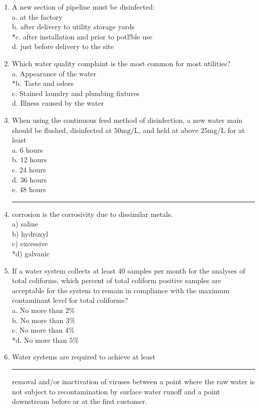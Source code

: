 \begin{enumerate}[1.]
\item A new section of pipeline must be disinfected:\\
a.  at the factory\\
b.  after delivery to utility storage yards\\
*c.  after installation and prior to potl!ble use\\
d. just before delivery to the site\\
\item Which water quality complaint is the most common for most utilities?\\
a. Appearance of the water\\
*b. Taste and odors\\
c. Stained laundry and plumbing fixtures\\
d. Illness caused by the water\\
\item When using the continuous feed method of disinfection, a new water main should be flushed, disinfected at $50 \mathrm{mg} / \mathrm{L}$, and held at above $25 \mathrm{mg} / \mathrm{L}$ for at least\\
a. 6 hours\\
b. 12 hours\\
c. 24 hours\\
d. 36  hours\\
e. 48 hours\\
\item \rule{2cm}{0.5pt}corrosion is the corrosivity due to dissimilar metals.\\
a) saline\\
b) hydroxyl\\
c) excessive\\
*d) galvanic\\
\item If a water system collects at least 40 samples per month for the analyses of total coliforms, which percent of total coliform positive samples are acceptable for the system to remain in compliance with the maximum contaminant level for total coliforms?\\
a. No more than $2 \%$\\
b. No more than $3 \%$\\
c. No more than $4 \%$\\
*d. No more than $5 \%$\\
\item Water systems are required to achieve at least \rule{1.5cm}{0.5pt} removal and/or inactivation of viruses between a point where the raw water is not subject to recontamination by surface water runoff and a point downstream before or at the first customer.\\

\end{enumerate}
